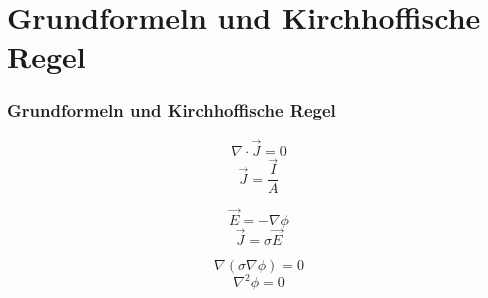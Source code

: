 \documentclass[xcolor=dvipsnames,envcountsect]{beamer}
\begin{document}
\section{Grundformeln und Kirchhoffische Regel}
\begin{frame}
	\frametitle{Grundformeln und Kirchhoffische Regel}
	\begin{equation}
		\nabla \cdot  \vec{J}=0
		\label{circuit:current_density_1}
	\end{equation}
	\begin{equation}
		\vec{J}=\frac{\vec{I}}{A}
		\label{circuit:current_density_3}
	\end{equation}
	
	\begin{equation}
		\vec{E}=-\nabla \phi
		\label{circuit:current_density_4}
	\end{equation}
	\begin{equation}
		\vec{J}=\sigma \vec{E}
		\label{circuit:current_density_2}
	\end{equation}

	\begin{equation}
		\nabla(\sigma \nabla \phi)=0
		\label{circuit:current_density_5}
	\end{equation}
	\begin{equation}
		\nabla^2 \phi=0
		\label{circuit:current_density_6}
	\end{equation}


\end{frame}
\end{document}
